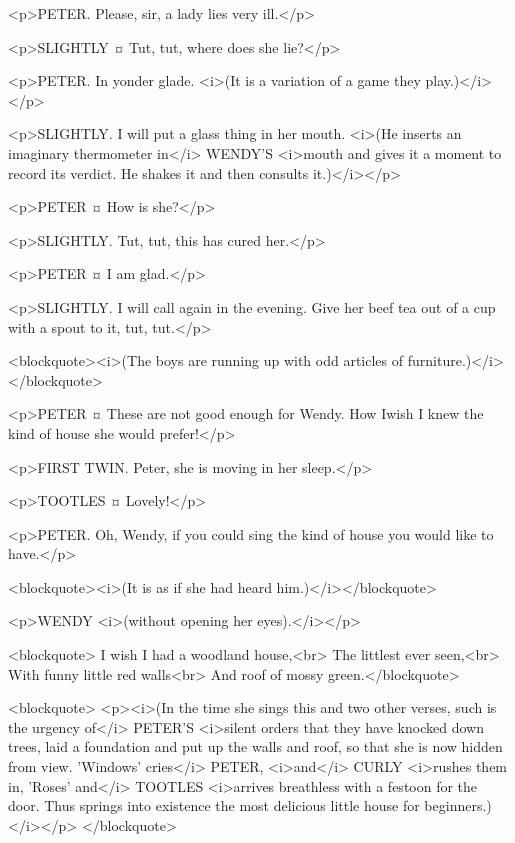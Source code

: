 <p>PETER. Please, sir, a lady lies very ill.</p>

<p>SLIGHTLY ¤
Tut, tut, where does she lie?</p>

<p>PETER. In yonder glade. <i>(It is a variation of a game they play.)</i></p>

<p>SLIGHTLY. I will put a glass thing in her mouth. <i>(He inserts an imaginary thermometer in</i> WENDY'S <i>mouth and gives it a moment to record its verdict. He shakes it and then consults it.)</i></p>

<p>PETER ¤
How is she?</p>

<p>SLIGHTLY. Tut, tut, this has cured her.</p>

<p>PETER ¤
I am glad.</p>

<p>SLIGHTLY. I will call again in the evening. Give her beef tea out of a cup with a spout to it, tut, tut.</p>

<blockquote><i>(The boys are running up with odd articles of furniture.)</i></blockquote>

<p>PETER ¤
These are not good enough for Wendy. How Iwish I knew the kind of house she would prefer!</p>

<p>FIRST TWIN. Peter, she is moving in her sleep.</p>

<p>TOOTLES ¤
Lovely!</p>

<p>PETER. Oh, Wendy, if you could sing the kind of house you would like to have.</p>

<blockquote><i>(It is as if she had heard him.)</i></blockquote>

<p>WENDY <i>(without opening her eyes).</i></p>

<blockquote> I wish I had a woodland house,<br> The littlest ever seen,<br> With funny little red walls<br> And roof of mossy green.</blockquote>

<blockquote> <p><i>(In the time she sings this and two other verses, such is the urgency of</i> PETER'S <i>silent orders that they have knocked down trees, laid a foundation and put up the walls and roof, so that she is now hidden from view. 'Windows' cries</i> PETER, <i>and</i> CURLY <i>rushes them in, 'Roses' and</i> TOOTLES <i>arrives breathless with a festoon for the door. Thus springs into existence the most delicious little house for beginners.)</i></p> </blockquote>

